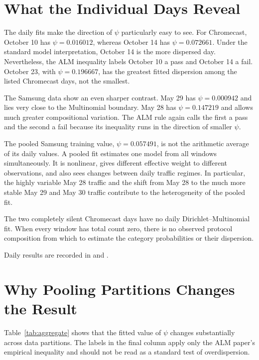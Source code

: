 \documentclass[11pt,a4paper]{article}
\begin{document}
\section{What the Individual Days Reveal}

The daily fits make the direction of $\psi$ particularly easy to see.  For
Chromecast, October 10 has $\psi=0.016012$, whereas October 14 has
$\psi=0.072661$.  Under the standard model interpretation, October 14 is the
more dispersed day.  Nevertheless, the ALM inequality labels October 10 a
pass and October 14 a fail.  October 23, with $\psi=0.196667$, has the greatest
fitted dispersion among the listed Chromecast days, not the smallest.

The Samsung data show an even sharper contrast.  May 29 has
$\psi=0.000942$ and lies very close to the Multinomial boundary.  May 28 has
$\psi=0.147219$ and allows much greater compositional variation.  The ALM rule
again calls the first a pass and the second a fail because its inequality runs
in the direction of smaller $\psi$.

The pooled Samsung training value, $\psi=0.057491$, is not the arithmetic
average of its daily values.  A pooled fit estimates one model from all
windows simultaneously.  It is nonlinear, gives different effective weight
to different observations, and also sees changes between daily traffic
regimes.  In particular, the highly variable May 28 traffic and the shift from
May 28 to the much more stable May 29 and May 30 traffic contribute to the
heterogeneity of the pooled fit.

The two completely silent Chromecast days have no daily Dirichlet--Multinomial
fit.  When every window has total count zero, there is no observed protocol
composition from which to estimate the category probabilities or their
dispersion.

Daily results are recorded in
 and
.

\section{Why Pooling Partitions Changes the Result}

Table~\ref{tab:aggregate} shows that the fitted value of $\psi$ changes
substantially across data partitions.  The labels in the final column apply
only the ALM paper's empirical inequality and should not be read as a standard
test of overdispersion.
\end{document}
